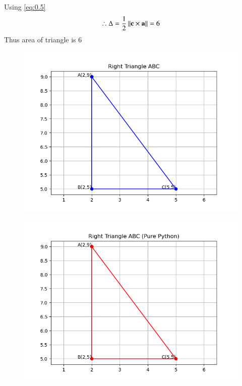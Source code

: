 \documentclass[journal]{IEEEtran}
\begin{document}
	
	
	Using \eqref{eq:0.5}
	\begin{align}
		\therefore	\Delta = \frac{1}{2}\left\lVert\mathbf{c}\times\mathbf{a}\right\rVert = 6
	\end{align}
	Thus area of triangle is $6$\\

	
	\begin{figure}[H]
		\centering
		\includegraphics[width = 0.7\columnwidth]{Figure_1.png}
		\caption*{}
		\label{q3.1}
	\end{figure}
	
	\begin{figure}[H]
		\centering
		\includegraphics[width = 0.7\columnwidth]{Figure_2.png}
		\caption*{}
		\label{q3.2}
	\end{figure}
		
\end{document}
